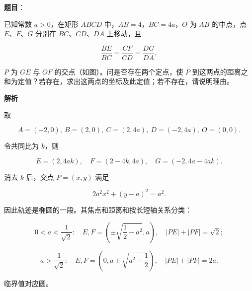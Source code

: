 \begin{answer}

\textbf{题目}：

已知常数 $a>0$，在矩形 $ABCD$ 中，$AB=4$，$BC=4a$，$O$ 为 $AB$ 的中点，点 $E\text{、}F\text{、}G$ 分别在 $BC\text{、}CD\text{、}DA$ 上移动，且

\nopagebreak[4]
\[
\frac{BE}{BC}=\frac{CF}{CD}=\frac{DG}{DA},
\]

$P$ 为 $GE$ 与 $OF$ 的交点（如图）。问是否存在两个定点，使 $P$ 到这两点的距离之和为定值？若存在，求出这两点的坐标及此定值；若不存在，请说明理由。
\nopagebreak[4]
\begin{center}\end{center}
\nopagebreak[4]
\textbf{解析}

取

\nopagebreak[4]
\[
A=(-2,0),\ B=(2,0),\ C=(2,4a),\ D=(-2,4a),\ O=(0,0).
\]

令共同比为 $k$，则

\nopagebreak[4]
\[
E=(2,4ak),\quad F=(2-4k,4a),\quad G=(-2,4a-4ak).
\]

消去 $k$ 后，交点 $P=(x,y)$ 满足

\nopagebreak[4]
\[
2a^2x^2+(y-a)^2=a^2.
\]

因此轨迹是椭圆的一段。其焦点和距离和按长短轴关系分类：

\nopagebreak[4]
\[
0<a<\frac1{\sqrt2}:\quad
E,F=\left(\pm\sqrt{\frac12-a^2},a\right),\quad
|PE|+|PF|=\sqrt2;
\]

\nopagebreak[4]
\[
a>\frac1{\sqrt2}:\quad
E,F=\left(0,a\pm\sqrt{a^2-\frac12}\right),\quad
|PE|+|PF|=2a.
\]

临界值对应圆。


\end{answer}
